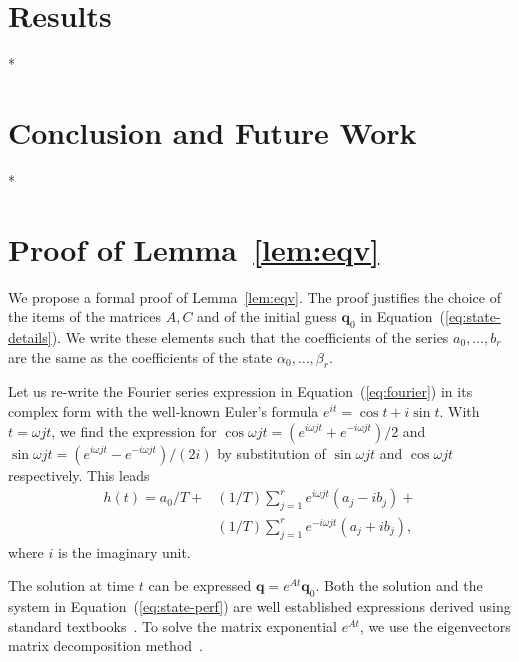 \documentclass[letterpaper,10pt,conference]{ieeeconf}
\theoremstyle{definition}
\begin{document}
\section{Results}         %
\label{sec:experimental}  %

*


\section{Conclusion and Future Work}
\label{sec:conclusion}

*


\balance

 

\leavevmode\thispagestyle{empty}\newpage
\nobalance

\appendices

\section{Proof of Lemma~\ref{lem:eqv}}
\label{app:proof-eqv}

We propose a formal proof of Lemma~\ref{lem:eqv}. The proof justifies the choice of the items of the matrices $A,C$ and of the initial guess $\mathbf{q}_0$ in Equation~(\ref{eq:state-details}). We write these elements such that the coefficients of the series $a_0,\dots,b_r$ are the same as the coefficients of the state $\alpha_0,\dots,\beta_r$.

Let us re-write the Fourier series expression in Equation~(\ref{eq:fourier}) in its complex form with the well-known Euler's formula $e^{it}=\cos{t}+i\sin{t}$. With $t=\omega jt$, we find the expression for $\cos{\omega jt}=(e^{i\omega jt}+e^{-i\omega jt})/2$ and $\sin{\omega jt}=(e^{i\omega jt}-e^{-i\omega jt})/(2i)$ by substitution of $\sin{\omega jt}$ and $\cos{\omega jt}$ respectively. This leads~\cite{kuo1967automatic}
\begin{equation}\begin{split}\label{eq:proof-complex}
  h(t)=a_0/T+&(1/T)\sum_{j=1}^{r}{e^{i\omega jt}(a_j-ib_j)}+\\&(1/T)\sum_{j=1}^{r}{e^{-i\omega jt}(a_j+ib_j)},
 \end{split}\end{equation}
where $i$ is the imaginary unit. 

The solution at time $t$ can be expressed $\mathbf{q}=e^{At}\mathbf{q}_0$. Both the solution and the system in Equation~(\ref{eq:state-perf}) are well established expressions derived using standard textbooks~\cite{kuo1967automatic, ogata2002modern}. To solve the matrix exponential $e^{At}$, we use the eigenvectors matrix decomposition method~\cite{moler2003nineteen}.
\end{document}
